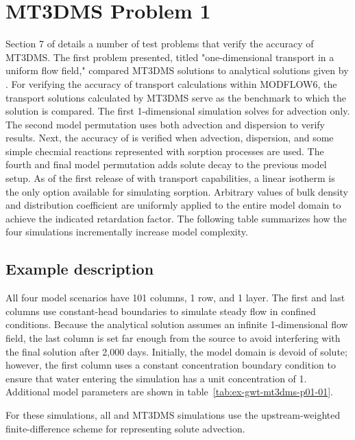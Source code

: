 \section{MT3DMS Problem 1}

Section 7 of \cite{zheng1999mt3dms} details a number of test problems that verify the accuracy of MT3DMS.  The first problem presented, titled "one-dimensional transport in a uniform flow field," compared MT3DMS solutions to analytical solutions given by \cite{vanGenuchtenAlves1982}.  For verifying the accuracy of transport calculations within MODFLOW6, the transport solutions calculated by MT3DMS serve as the benchmark to which the \mf solution is compared.  The first 1-dimensional simulation solves for advection only.  The second model permutation uses both advection and dispersion to verify \mf results.  Next, the accuracy of \mf is verified when advection, dispersion, and some simple checmial reactions represented with sorption processes are used.  The fourth and final model permutation adds solute decay to the previous model setup. As of the first release of \mf with transport capabilities, a linear isotherm is the only option available for simulating sorption. Arbitrary values of bulk density and distribution coefficient are uniformly applied to the entire model domain to achieve the indicated retardation factor. The following table summarizes how the four simulations incrementally increase model complexity.



\subsection{Example description}

All four model scenarios have 101 columns, 1 row, and 1 layer. The first and last columns use constant-head boundaries to simulate steady flow in confined conditions. Because the analytical solution assumes an infinite 1-dimensional flow field, the last column is set far enough from the source to avoid interfering with the final solution after 2,000 days. Initially, the model domain is devoid of solute; however, the first column uses a constant concentration boundary condition to ensure that water entering the simulation has a unit concentration of 1. Additional model parameters are shown in table~\ref{tab:ex-gwt-mt3dms-p01-01}.

For these simulations, all \mf and MT3DMS simulations use the upstream-weighted finite-difference scheme for representing solute advection.

